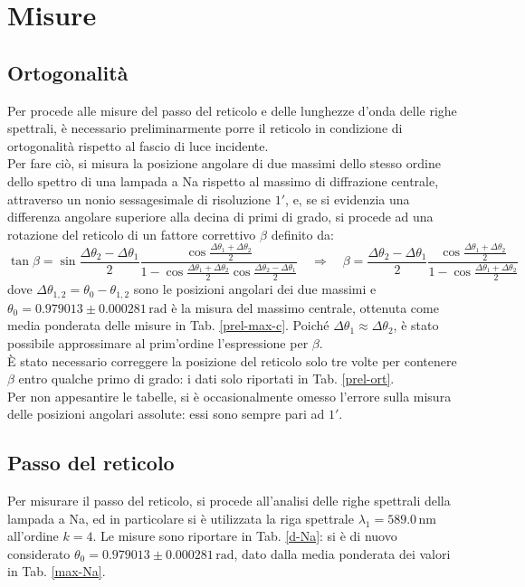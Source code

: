 \documentclass[]{article}
\let\oldsection\section%
\renewcommand{\section}{%
	\renewcommand{\theequation}{\thesection.\arabic{equation}}%
	\oldsection}%
\let\oldsubsection\subsection%
\renewcommand{\subsection}{%
	\renewcommand{\theequation}{\thesubsection.\arabic{equation}}%
	\oldsubsection}%
\begin{document}
    \section{Misure}
    \label{par:misure}

    \subsection{Ortogonalità}
    Per procede alle misure del passo del reticolo e delle lunghezze d'onda delle righe spettrali, è necessario preliminarmente porre il reticolo in condizione di ortogonalità rispetto al fascio di luce incidente. \\
    Per fare ciò, si misura la posizione angolare di due massimi dello stesso ordine dello spettro di una lampada a Na rispetto al massimo di diffrazione centrale, attraverso un nonio sessagesimale di risoluzione $1'$, e, se si evidenzia una differenza angolare superiore alla decina di primi di grado, si procede ad una rotazione del reticolo di un fattore correttivo $\beta$ definito da:
    \begin{equation}
        \label{beta}
        \tan{\beta} = \sin{\frac{\Delta\theta_2 - \Delta\theta_1}{2}} \frac{\cos{\frac{\Delta\theta_1 + \Delta\theta_2}{2}}}{1 - \cos{\frac{\Delta\theta_1 + \Delta\theta_2}{2}} \cos{\frac{\Delta\theta_2 - \Delta\theta_1}{2}}} \quad\Longrightarrow\quad
        \beta = \frac{\Delta\theta_2 - \Delta\theta_1}{2} \frac{\cos{\frac{\Delta\theta_1 + \Delta\theta_2}{2}}}{1 - \cos{\frac{\Delta\theta_1 + \Delta\theta_2}{2}}}
    \end{equation}
    dove $\Delta\theta_{1,2} = \theta_0 - \theta_{1,2}$ sono le posizioni angolari dei due massimi e $\theta_0 = 0.979013 \pm 0.000281 \,\text{rad}$ è la misura del massimo centrale, ottenuta come media ponderata delle misure in Tab. \ref{prel-max-c}. Poiché $\Delta\theta_1 \approx \Delta\theta_2$, è stato possibile approssimare al prim'ordine l'espressione per $\beta$. \\
    È stato necessario correggere la posizione del reticolo solo tre volte per contenere $\beta$ entro qualche primo di grado: i dati solo riportati in Tab. \ref{prel-ort}. \\
    Per non appesantire le tabelle, si è occasionalmente omesso l'errore sulla misura delle posizioni angolari assolute: essi sono sempre pari ad $1'$.

    \subsection{Passo del reticolo}
    Per misurare il passo del reticolo, si procede all'analisi delle righe spettrali della lampada a Na, ed in particolare si è utilizzata la riga spettrale $\lambda_1 = 589.0\,\text{nm}$ all'ordine $k=4$. Le misure sono riportare in Tab. \ref{d-Na}: si è di nuovo considerato $\theta_0 = 0.979013 \pm 0.000281 \,\text{rad}$, dato dalla media ponderata dei valori in Tab. \ref{max-Na}.
\end{document}
